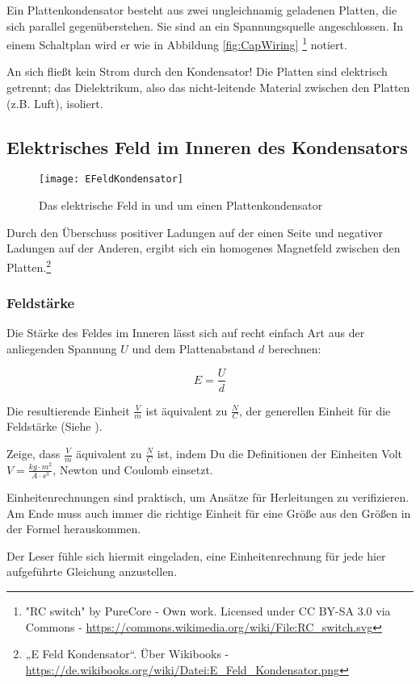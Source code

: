 Ein Plattenkondensator besteht aus zwei ungleichnamig geladenen Platten, die sich parallel gegenüberstehen. Sie sind an ein Spannungsquelle angeschlossen. In einem Schaltplan wird er wie in Abbildung \ref{fig:CapWiring} \footnote{"RC switch" by PureCore - Own work. Licensed under CC BY-SA 3.0 via Commons - \url{https://commons.wikimedia.org/wiki/File:RC_switch.svg}} notiert.

\begin{Wichtig}
An sich fließt kein Strom durch den Kondensator! Die Platten sind elektrisch getrennt; das Dielektrikum, also das nicht-leitende Material zwischen den Platten (z.B. Luft), isoliert. 
\end{Wichtig}


\subsection{Elektrisches Feld im Inneren des Kondensators}

\begin{figure}[h!]
	\centering
	\texttt{[image: EFeldKondensator]}
	\caption{Das elektrische Feld in und um einen Plattenkondensator}
\end{figure}

Durch den Überschuss positiver Ladungen auf der einen Seite und negativer Ladungen auf der Anderen, ergibt sich ein homogenes Magnetfeld zwischen den Platten.\footnote{„E Feld Kondensator“. Über Wikibooks - \url{https://de.wikibooks.org/wiki/Datei:E_Feld_Kondensator.png}}

\subsubsection{Feldstärke}

Die Stärke des Feldes im Inneren lässt sich auf recht einfach Art aus der anliegenden Spannung $U$ und dem Plattenabstand $d$ berechnen:

\begin{equation} \label{eq:feldstaerke_kondensator}
	E = \frac{U}{d}
\end{equation}

Die resultierende Einheit $\frac{V}{m}$ ist äquivalent zu $\frac{N}{C}$, der generellen Einheit für die Feldstärke (Siehe ).

\begin{Aufgabe}
Zeige, dass $\frac{V}{m}$ äquivalent zu $\frac{N}{C}$ ist, indem Du die Definitionen der Einheiten Volt $V=\frac{kg \cdot m^2}{A \cdot s^3}$, Newton und Coulomb einsetzt.

Einheitenrechnungen sind praktisch, um Ansätze für Herleitungen zu verifizieren. Am Ende muss auch immer die richtige Einheit für eine Größe aus den Größen in der Formel herauskommen.

Der Leser fühle sich hiermit eingeladen, eine Einheitenrechnung für jede hier aufgeführte Gleichung anzustellen. 
\end{Aufgabe}


